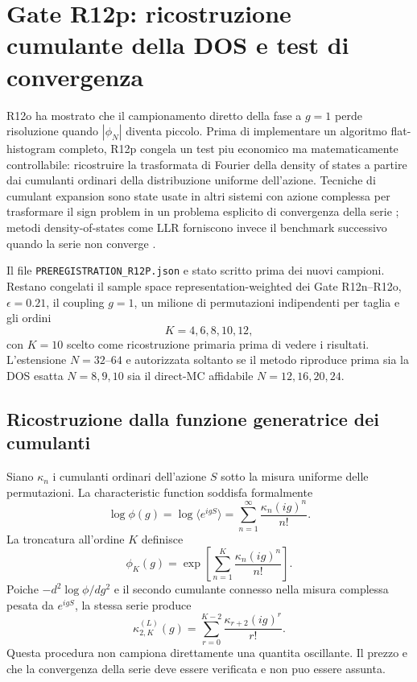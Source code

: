 \documentclass[11pt,a4paper]{article}
\begin{document}
\section{Gate R12p: ricostruzione cumulante della DOS e test di convergenza}

R12o ha mostrato che il campionamento diretto della fase a $g=1$ perde risoluzione quando $|\phi_N|$ diventa piccolo. Prima di implementare un algoritmo flat-histogram completo, R12p congela un test piu economico ma matematicamente controllabile: ricostruire la trasformata di Fourier della density of states a partire dai cumulanti ordinari della distribuzione uniforme dell'azione. Tecniche di cumulant expansion sono state usate in altri sistemi con azione complessa per trasformare il sign problem in un problema esplicito di convergenza della serie \cite{EjiriKanayaUmeda2012}; metodi density-of-states come LLR forniscono invece il benchmark successivo quando la serie non converge \cite{LangfeldLucini2014}.

Il file \texttt{PREREGISTRATION\_R12P.json} e stato scritto prima dei nuovi campioni. Restano congelati il sample space representation-weighted dei Gate R12n--R12o, $\epsilon=0.21$, il coupling $g=1$, un milione di permutazioni indipendenti per taglia e gli ordini
\begin{equation}
 K=4,6,8,10,12,
\end{equation}
con $K=10$ scelto come ricostruzione primaria prima di vedere i risultati. L'estensione $N=32$--$64$ e autorizzata soltanto se il metodo riproduce prima sia la DOS esatta $N=8,9,10$ sia il direct-MC affidabile $N=12,16,20,24$.

\subsection{Ricostruzione dalla funzione generatrice dei cumulanti}

Siano $\kappa_n$ i cumulanti ordinari dell'azione $S$ sotto la misura uniforme delle permutazioni. La characteristic function soddisfa formalmente
\begin{equation}
 \log\phi(g)=\log\langle e^{igS}\rangle
 =\sum_{n=1}^{\infty}\frac{\kappa_n(ig)^n}{n!}.
 \label{eq:r12p_logphi}
\end{equation}
La troncatura all'ordine $K$ definisce
\begin{equation}
 \phi_K(g)=\exp\left[\sum_{n=1}^{K}\frac{\kappa_n(ig)^n}{n!}\right].
\end{equation}
Poiche $-d^2\log\phi/dg^2$ e il secondo cumulante connesso nella misura complessa pesata da $e^{igS}$, la stessa serie produce
\begin{equation}
 \kappa_{2,K}^{(L)}(g)=\sum_{r=0}^{K-2}\frac{\kappa_{r+2}(ig)^r}{r!}.
 \label{eq:r12p_k2series}
\end{equation}
Questa procedura non campiona direttamente una quantita oscillante. Il prezzo e che la convergenza della serie deve essere verificata e non puo essere assunta.
\end{document}
